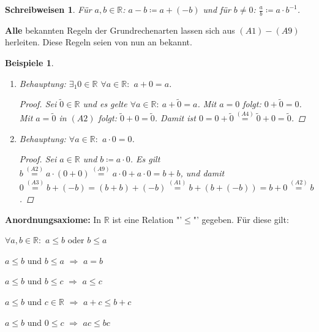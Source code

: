 \documentclass[12pt]{extreport} %
\newcommand{\R}{\mathbb{R}}
\theoremstyle{named}
\theoremstyle{itshape}
\theoremstyle{normal}
\newtheorem*{beispiele}{Beispiele}
\newtheorem*{schreibweisen}{Schreibweisen}
\begin{document}
\begin{schreibweisen}
	Für $a, b \in \R$: $a - b \coloneqq a + (-b)$ und für $b \neq 0$: $ \frac{a}{b} \coloneqq a \cdot b^{-1}$.
\end{schreibweisen}


\textbf{Alle} bekannten Regeln der Grundrechenarten lassen sich aus $(A1)-(A9)$ herleiten. Diese Regeln seien von nun an bekannt.


\begin{beispiele} ~\
	\begin{enumerate}
		\item Behauptung: $\exists_{1} 0 \in  \R$ $\forall a \in \R:$ $a + 0 = a$.
		  \begin{proof}
			Sei $\tilde{0} \in \R$ und es gelte $\forall a \in \R: \: a + \tilde{0} = a$. Mit $a = 0$ folgt: $0 + \tilde{0} = 0$. Mit $a = \tilde{0}$ in $(A2)$ folgt: 
			$\tilde{0} + 0 = \tilde{0}$. Damit ist $0 = 0 + \tilde{0} \overset{(A4)}{=} \tilde{0} + 0 = \tilde{0}$.
		  \end{proof}
		 \item Behauptung: $\forall a \in \R:$ $a \cdot 0 = 0$.
		   \begin{proof}
		      Sei $a \in \R$ und $b \coloneqq a \cdot 0$. Es gilt $b \overset{(A2)}{=} a \cdot (0 + 0) \overset{(A9)}{=} a \cdot 0 + a \cdot 0 = b + b$, und damit 
		      $0 \overset{(A3)}{=} b + (-b) = (b + b) + (-b) \overset{(A1)}{=} b + (b + (-b)) = b + 0 \overset{(A2)}{=} b$.
		   \end{proof}
	\end{enumerate}
\end{beispiele}

\textbf{Anordnungsaxiome:} In $\R$ ist eine Relation "'$\leq$"' gegeben. F\"ur diese gilt:
\begin{description} \addtolength{\itemindent}{0.4cm}
	\item[$(A10)$] $\forall a, b \in \R:$ $a \leq b$ oder $b \leq a$ \label{a.axiom-a10}
	\item[$(A11)$] $a \leq b$ und $b \leq a$ $\Rightarrow$ $a = b$ \label{a.axiom-a11}
	\item[$(A12)$] $a \leq b$ und $b \leq c$ $\Rightarrow$ $a \leq c$ \label{a.axiom-a12}
	\item[$(A13)$] $a \leq b$ und $c \in \R$ $\Rightarrow$ $a + c \leq b + c$ \label{a.axiom-a13}
	\item[$(A14)$] $a \leq b$ und $0 \leq c$ $\Rightarrow$ $ac \leq b c$ \label{a.axiom-a14}
\end{description}
\end{document}
